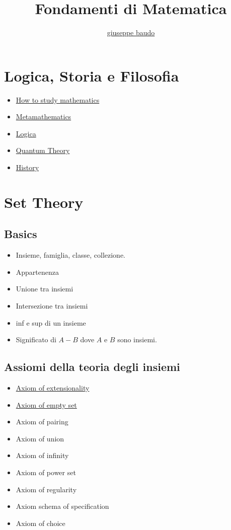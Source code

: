 \documentclass[a4paper,10pt]{article}
\title{Fondamenti di Matematica}
\author{\href{http://www.baudo.hol.es}{giuseppe baudo}}
\begin{document}
\maketitle

\section{Logica, Storia e Filosofia}
\begin{itemize}
 \item \href{HowToStudy.pdf}{How to study mathematics}
  \item \href{Metamathematics.pdf}{Metamathematics}
  \item \href{Logics.pdf}{Logica}
  \item \href{QuantumTheory.pdf}{Quantum Theory}
  \item \href{history.pdf}{History} 
\end{itemize}

\section{Set Theory}
\subsection*{Basics}
\begin{itemize}
 \item Insieme, famiglia, classe, collezione.
 \item Appartenenza
 \item Unione tra insiemi
 \item Intersezione tra insiemi 
 \item inf e sup di un insieme
 \item Significato di $A - B$ dove $A$ e $B$ sono insiemi.
\end{itemize}
 
\subsection*{Assiomi della teoria degli insiemi}
\begin{itemize}
 \item \href{./Extensionality.pdf}{Axiom of extensionality}
 \item \href{./EmptySet.pdf}{Axiom of empty set}
 \item Axiom of pairing
 \item Axiom of union
 \item Axiom of infinity
 \item Axiom of power set
 \item Axiom of regularity
 \item Axiom schema of specification
 \item Axiom of choice
\end{itemize}
\end{document}
